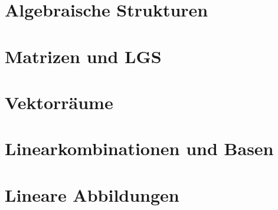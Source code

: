 \documentclass[]{article}
\begin{document}
\newcommand{\function}[3]{#1 : #2 \rightarrow #3}
\newcommand{\f}[2]{f : #1 \rightarrow #2 }
\newcommand{\g}[2]{g : #1 \rightarrow #2 }

\newcommand{\frr}{\f{\realset}{\realset}}
\newcommand{\fab}{\f{[a,b]}{\realset}}
\newcommand{\gab}{\g{[a,b]}{\realset}}
\newcommand{\fabex}{\f{(a,b)}{\realset}}

\newcommand{\functionab}[1]{#1 : [a,b] \rightarrow \realset}

\newcommand{\liminfty}[1]{\lim_{#1 \rightarrow \infty}}
\newcommand{\limninfty}[1]{\lim_{#1 \rightarrow -\infty} }
\newcommand{\limto}[2]{\lim_{#1 \rightarrow #2} }
\newcommand{\limup}[2]{\lim_{#1 \uparrow #2} }
\newcommand{\limdown}[2]{\lim_{#1 \downarrow #2} }
\newcommand{\realset}{\mathbb{R}}
\newcommand{\complexset}{\mathbb{C}}
\newcommand{\naturalset}{\mathbb{N}}
\newcommand{\sequence}[2]{(#1_{#2})_{#2 \in \naturalset}}
\newcommand{\sequencean}{\sequence{a}{n}}
\newcommand{\sequencebn}{\sequence{b}{n}}
\newcommand{\inreal}[1]{#1 \in \realset}
\newcommand{\xinreal}[1]{x \in \realset}
\newcommand{\forallin}[2]{\forall #1 \in #2}
\newcommand{\forallinreal}[1]{\forallin{#1}{\realset}}
\newcommand{\forallxinreal}{\forallin{x}{\realset}}

\newcommand{\series}[4]{\sum_{#1 = #2}^{#3} #4_{#1}}
\newcommand{\serieszeroinfty}[2]{\series{#1}{0}{\infty}{#2}}
\newcommand{\serieskzeroinfty}[1]{\serieszeroinfty{k}{#1}}
\newcommand{\serieskinfty}[2]{\series{k}{#1}{\infty}{#2}}

\newtheorem{definition}{Definition}
\newtheorem{satz}{Satz}

\section{Algebraische Strukturen}

\section{Matrizen und LGS}

\section{Vektorräume}

\section{Linearkombinationen und Basen}

\section{Lineare Abbildungen}
\end{document}
